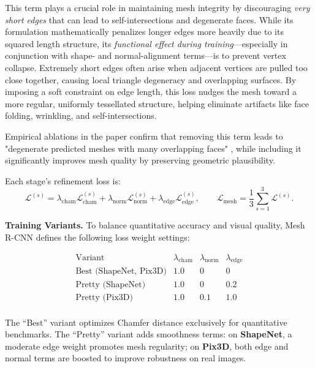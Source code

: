 This term plays a crucial role in maintaining mesh integrity by discouraging \emph{very short edges} that can lead to self-intersections and degenerate faces. While its formulation mathematically penalizes longer edges more heavily due to its squared length structure, its \emph{functional effect during training}—especially in conjunction with shape- and normal-alignment terms—is to prevent vertex collapse. Extremely short edges often arise when adjacent vertices are pulled too close together, causing local triangle degeneracy and overlapping surfaces. By imposing a soft constraint on edge length, this loss nudges the mesh toward a more regular, uniformly tessellated structure, helping eliminate artifacts like face folding, wrinkling, and self-intersections. 

Empirical ablations in the paper confirm that removing this term leads to "degenerate predicted meshes with many overlapping faces" \cite{gkioxari2020_meshrcnn}, while including it significantly improves mesh quality by preserving geometric plausibility.

Each stage's refinement loss is:
\[
\mathcal{L}^{(s)} = 
\lambda_{\text{cham}} \mathcal{L}_{\text{cham}}^{(s)} +
\lambda_{\text{norm}} \mathcal{L}_{\text{norm}}^{(s)} +
\lambda_{\text{edge}} \mathcal{L}_{\text{edge}}^{(s)},
\qquad
\mathcal{L}_{\text{mesh}} = \frac{1}{3} \sum_{s=1}^3 \mathcal{L}^{(s)}.
\]

\medskip
\noindent
\textbf{Training Variants.}  
To balance quantitative accuracy and visual quality, Mesh R-CNN defines the following loss weight settings:

\[
\begin{array}{l|ccc}
    \text{Variant} & 
    \lambda_{\text{cham}} & 
    \lambda_{\text{norm}} & 
    \lambda_{\text{edge}} \\ \hline
    \text{Best (ShapeNet, Pix3D)}     & 1.0 & 0   & 0   \\
    \text{Pretty (ShapeNet)}          & 1.0 & 0   & 0.2 \\
    \text{Pretty (Pix3D)}             & 1.0 & 0.1 & 1.0 \\
\end{array}
\]

The “Best” variant optimizes Chamfer distance exclusively for quantitative benchmarks. The “Pretty” variant adds smoothness terms: on \textbf{ShapeNet}, a moderate edge weight promotes mesh regularity; on \textbf{Pix3D}, both edge and normal terms are boosted to improve robustness on real images.

